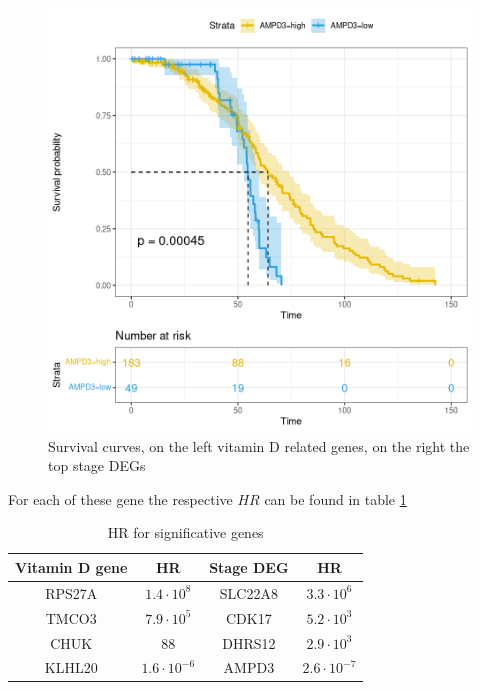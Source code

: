 \documentclass[fleqn,10pt]{SelfArx} %
\begin{document}
\begin{figure}[ht]
\begin{multicols}{2}
		 		\includegraphics[width=0.7\linewidth]{figures/AMPD3.png}

			\end{multicols}
			\caption{Survival curves, on the left vitamin D related genes, on the right the top stage DEGs}
			\label{fig:surv_curve}
		 \end{figure}

		For each of these gene the respective $HR$ can be found in table \ref{tab:hr}

		\begin{table}[ht]
			\begin{tabular}{|cc|cc|}
				\hline
				Vitamin D gene & HR & Stage DEG & HR\\
				\hline
				RPS27A & $1.4\cdot 10^8$ & SLC22A8 & $3.3\cdot 10^6$\\
				\hline
				TMCO3 & $7.9\cdot 10^5$ & CDK17 & $5.2\cdot 10^3$\\
				\hline
				CHUK & $88$ & DHRS12 & $2.9\cdot 10^3$\\
				\hline
				KLHL20 & $1.6\cdot 10^{-6}$ & AMPD3 & $2.6\cdot 10^{-7}$\\
				\hline
			\end{tabular}
			\caption{HR for significative genes}
			\label{tab:hr}
		\end{table}
\end{document}
